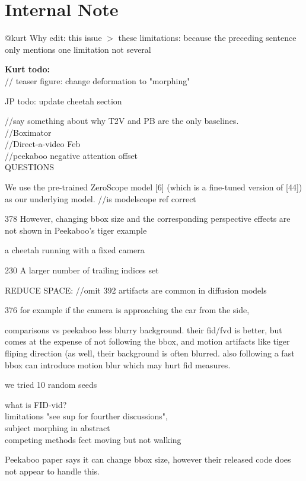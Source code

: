 \newpage

\section{Internal Note}
\label{sec:note}

@kurt Why edit:
this issue $>$ these limitations: because the preceding sentence only mentions one limitation not several

\textbf{Kurt todo:}\\
// teaser figure: change deformation to "morphing"


JP todo:
update cheetah section

//say something about why T2V and PB are the only baselines.\\
//Boximator\\
//Direct-a-video Feb\\
//peekaboo negative attention offset\\

QUESTIONS

We use the pre-trained ZeroScope model [6] (which is a fine-tuned version of [44]) as our underlying model. //is modelscope ref correct

378 However, changing bbox size and the corresponding perspective effects are not shown in Peekaboo’s tiger example

a cheetah running with a fixed camera

230 A larger number of trailing indices set

REDUCE SPACE: 
//omit 392 artifacts are common in diffusion models

376  for example if the camera is approaching the car from the side, 

comparisons vs peekaboo
less blurry background.
their fid/fvd is better, but comes at the expense of not following the bbox, and motion artifacts like tiger fliping direction (as well, their background is often blurred.
also following a fast bbox can introduce motion blur which may hurt fid measures.

we tried 10 random seeds

what is FID-vid?\\
limitations "see sup for fourther discussions",\\
subject morphing in abstract\\
competing methods feet moving but not walking

Peekaboo paper says it can change bbox size, however their released code does not appear to handle this.

